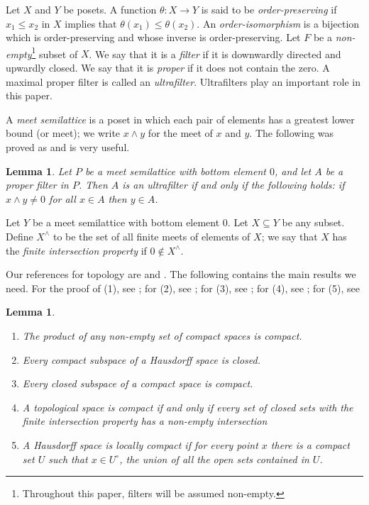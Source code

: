 \documentclass[a4paper]{amsart}
\newtheorem{lemma}[theorem]{Lemma}
\begin{document}
Let $X$ and $Y$ be posets.
A function $\theta \colon X \rightarrow Y$ is said to be {\em order-preserving}
if $x_{1} \leq x_{2}$ in $X$ implies that $\theta (x_{1}) \leq \theta (x_{2})$.
An {\em order-isomorphism} is a bijection which is order-preserving and whose inverse is 
order-preserving.
Let $F$ be a {\em non-empty}\footnote{Throughout this paper, filters will be assumed non-empty.} subset of $X$.
We say that it is a {\em filter} if it is downwardly directed and upwardly closed.
We say that it is {\em proper} if it does not contain the zero.
A maximal proper filter is called an {\em ultrafilter}.
Ultrafilters play an important role in this paper.

A {\em meet semilattice} is a poset in which each pair of elements has a greatest lower bound (or meet);
we write $x \wedge y$ for the  meet of $x$ and $y$.
The following was proved as \cite[Lemma 12.3]{Exel} and is very useful.

\begin{lemma}\label{lem:exel} Let $P$ be a meet semilattice with bottom element $0$,
and let $A$ be a proper filter in $P$.
Then $A$ is an ultrafilter if and only if the following holds:
if $x \wedge y \neq 0$ for all $x \in A$ then $y \in A$.
\end{lemma}

Let $Y$ be a meet semilattice with bottom element $0$.
Let $X \subseteq Y$ be any subset.
Define $X^{\wedge}$ to be the set of all finite meets of elements of $X$;
we say that $X$ has the {\em finite intersection property} if $0 \notin X^{\wedge}$.

Our references for topology are \cite{Simmons} and \cite{Willard}.
The following contains the main results we need.
For the proof of (1), see \cite[Section 23, Theorem A]{Simmons};
for (2), see \cite[Section 26, Theorem D]{Simmons};
for (3), see \cite[Section 21, Theorem A]{Simmons};
for (4), see \cite[Section 21, Theorem D]{Simmons};
for (5), see \cite[Theorem 18.2]{Willard}

\begin{lemma}\label{lem:topology-needed}\mbox{}
\begin{enumerate}

\item The product of any non-empty set of compact spaces is compact.

\item Every compact subspace of a Hausdorff space is closed.

\item Every closed subspace of a compact space is compact.

\item A topological space is compact if and only if every set of closed sets with the finite intersection property has a non-empty intersection

\item A Hausdorff space is locally compact if for every point $x$ there is a compact set $U$ such that $x \in U^{\circ}$, the union of all the open sets contained in $U$.

\end{enumerate}
\end{lemma}
\end{document}

